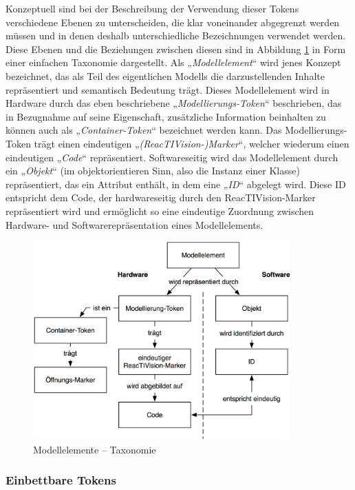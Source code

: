 Konzeptuell sind bei der Beschreibung der Verwendung dieser Tokens verschiedene Ebenen zu unterscheiden, die klar voneinander abgegrenzt werden müssen und in denen deshalb unterschiedliche Bezeichnungen verwendet werden. Diese Ebenen und die Beziehungen zwischen diesen sind in Abbildung \ref{fig:img_ImplementierungInput_ElementTaxonomie} in Form einer einfachen Taxonomie dargestellt. Als „\emph{Modellelement}“ wird jenes Konzept bezeichnet, das als Teil des eigentlichen Modells die darzustellenden Inhalte repräsentiert und semantisch Bedeutung trägt. Dieses Modellelement wird in Hardware durch das eben beschriebene „\emph{Modellierungs-Token}“ beschrieben, das in Bezugnahme auf seine Eigenschaft, zusätzliche Information beinhalten zu können auch als „\emph{Container-Token}“ bezeichnet werden kann. Das Modellierungs-Token trägt einen eindeutigen „\emph{(ReacTIVision-)Marker}“, welcher wiederum einen eindeutigen „\emph{Code}“ repräsentiert. Softwareseitig wird das Modellelement durch ein „\emph{Objekt}“ (im objektorientieren Sinn, also die Instanz einer Klasse) repräsentiert, das ein Attribut enthält, in dem eine  „\emph{ID}“ abgelegt wird. Diese ID entspricht dem Code, der hardwareseitig durch den ReacTIVision-Marker repräsentiert wird und ermöglicht so eine eindeutige Zuordnung zwischen Hardware- und Softwarerepräsentation eines Modellelements.

\begin{figure}[htbp]
	\centering
		\includegraphics[height=3in]{img/ImplementierungInput/ElementTaxonomie.png}
	\caption{Modellelemente -- Taxonomie}
	\label{fig:img_ImplementierungInput_ElementTaxonomie}
\end{figure}


\subsubsection{Einbettbare Tokens} %
\label{einbettbare_tokens}

